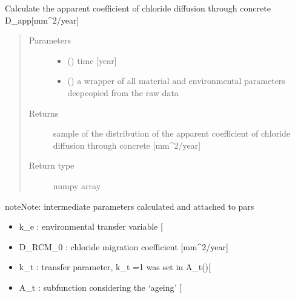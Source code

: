 \documentclass[letterpaper,10pt,english]{sphinxmanual}
\begin{document}
\begin{fulllineitems}
\label{\detokenize{chloride:chloride.D_app}}
\sphinxAtStartPar
Calculate the apparent coefficient of chloride diffusion through concrete D\_app{[}mm\textasciicircum{}2/year{]}
\begin{quote}\begin{description}
\item[{Parameters}] \leavevmode\begin{itemize}
\item {} 
\sphinxAtStartPar
{} (\sphinxstyleliteralemphasis{\sphinxupquote{, }}) \textendash{} time {[}year{]}

\item {} 
\sphinxAtStartPar
{} () \textendash{} a wrapper of all material and environmental parameters deep\sphinxhyphen{}copied from the raw data

\end{itemize}

\item[{Returns}] \leavevmode
\sphinxAtStartPar
sample of the distribution of the apparent coefficient of chloride diffusion through concrete {[}mm\textasciicircum{}2/year{]}

\item[{Return type}] \leavevmode
\sphinxAtStartPar
numpy array

\end{description}\end{quote}

\begin{sphinxadmonition}{note}{Note:}
\sphinxAtStartPar
intermediate parameters calculated and attached to pars
\begin{itemize}
\item {} 
\sphinxAtStartPar
k\_e     : environmental transfer variable {[}\sphinxhyphen{}{]}

\item {} 
\sphinxAtStartPar
D\_RCM\_0 : chloride migration coefficient {[}mm\textasciicircum{}2/year{]}

\item {} 
\sphinxAtStartPar
k\_t     : transfer parameter, k\_t =1 was set in A\_t(){[}\sphinxhyphen{}{]}

\item {} 
\sphinxAtStartPar
A\_t     : subfunction considering the ‘ageing’ {[}\sphinxhyphen{}{]}

\end{itemize}
\end{sphinxadmonition}

\end{fulllineitems}
\end{document}
